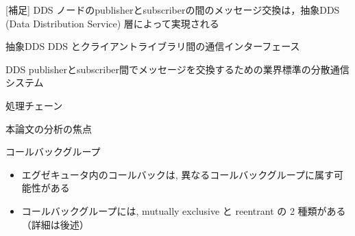 \begin{frame}{[補足] DDS}
    ノードのpublisherとsubscriberの間のメッセージ交換は，抽象DDS (Data Distribution Service) 層によって実現される

    \begin{block}{抽象DDS}
        DDS とクライアントライブラリ間の通信インターフェース
    \end{block}
    \begin{block}{DDS}
        publisherとsubscriber間でメッセージを交換するための業界標準の分散通信システム
    \end{block}
\end{frame}

\begin{frame}{処理チェーン}
\end{frame}

\begin{frame}{本論文の分析の焦点}
\end{frame}

\begin{frame}{コールバックグループ}
    \begin{itemize}
        \item エグゼキュータ内のコールバックは, 異なるコールバックグループに属す可能性がある
        \item コールバックグループには, mutually exclusive と reentrant の 2 種類がある（詳細は後述）
    \end{itemize}
\end{frame}

